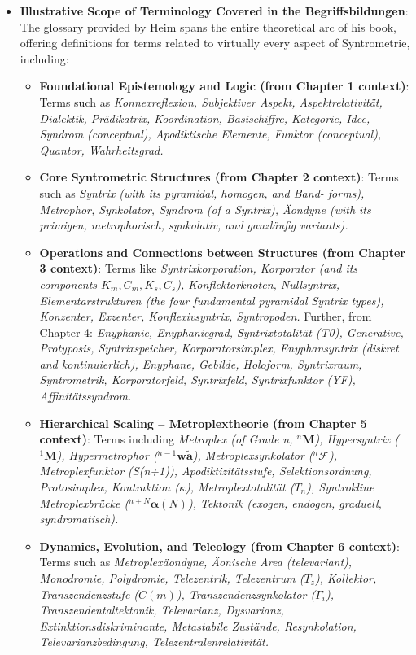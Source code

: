 \documentclass[
    12pt,              %
    a4paper,           %
    headings=normal,   %
    twoside=true,      %
    BCOR=8mm,          %
]{scrbook}
\begin{document}
\begin{itemize}
    \item \textbf{Illustrative Scope of Terminology Covered in the Begriffsbildungen}:
    The glossary provided by Heim spans the entire theoretical arc of his book, offering definitions for terms related to virtually every aspect of Syntrometrie, including:
    \begin{itemize}
        \item \textbf{Foundational Epistemology and Logic (from Chapter 1 context)}: Terms such as \textit{Konnexreflexion, Subjektiver Aspekt, Aspektrelativität, Dialektik, Prädikatrix, Koordination, Basischiffre, Kategorie, Idee, Syndrom (conceptual), Apodiktische Elemente, Funktor (conceptual), Quantor, Wahrheitsgrad.}
        \item \textbf{Core Syntrometric Structures (from Chapter 2 context)}: Terms such as \textit{Syntrix (with its pyramidal, homogen, and Band- forms), Metrophor, Synkolator, Syndrom (of a Syntrix), Äondyne (with its primigen, metrophorisch, synkolativ, and ganzläufig variants).}
        \item \textbf{Operations and Connections between Structures (from Chapter 3 context)}: Terms like \textit{Syntrixkorporation, Korporator (and its components \( K_m, C_m, K_s, C_s \)), Konflektorknoten, Nullsyntrix, Elementarstrukturen (the four fundamental pyramidal Syntrix types), Konzenter, Exzenter, Konflexivsyntrix, Syntropoden.} Further, from Chapter 4: \textit{Enyphanie, Enyphaniegrad, Syntrixtotalität (T0), Generative, Protyposis, Syntrixspeicher, Korporatorsimplex, Enyphansyntrix (diskret and kontinuierlich), Enyphane, Gebilde, Holoform, Syntrixraum, Syntrometrik, Korporatorfeld, Syntrixfeld, Syntrixfunktor (YF), Affinitätssyndrom.}
        \item \textbf{Hierarchical Scaling – Metroplextheorie (from Chapter 5 context)}: Terms including \textit{Metroplex (of Grade n, \( {}^n\mathbf{M} \)), Hypersyntrix (\( {}^1\mathbf{M} \)), Hypermetrophor (\( {}^{n-1}\mathbf{w\widetilde{a}} \)), Metroplexsynkolator (\( {}^n\mathcal{F} \)), Metroplexfunktor (S(n+1)), Apodiktizitätsstufe, Selektionsordnung, Protosimplex, Kontraktion (\(\kappa\)), Metroplextotalität (\( T_n \)), Syntrokline Metroplexbrücke (\( {}^{n+N}\bm{\alpha}(N) \)), Tektonik (exogen, endogen, graduell, syndromatisch).}
        \item \textbf{Dynamics, Evolution, and Teleology (from Chapter 6 context)}: Terms such as \textit{Metroplexäondyne, Äonische Area (televariant), Monodromie, Polydromie, Telezentrik, Telezentrum (\(T_z\)), Kollektor, Transzendenzstufe (\(C(m)\)), Transzendenzsynkolator (\(\Gamma_i\)), Transzendentaltektonik, Televarianz, Dysvarianz, Extinktionsdiskriminante, Metastabile Zustände, Resynkolation, Televarianzbedingung, Telezentralenrelativität.}

\end{itemize}
\end{itemize}
\end{document}
